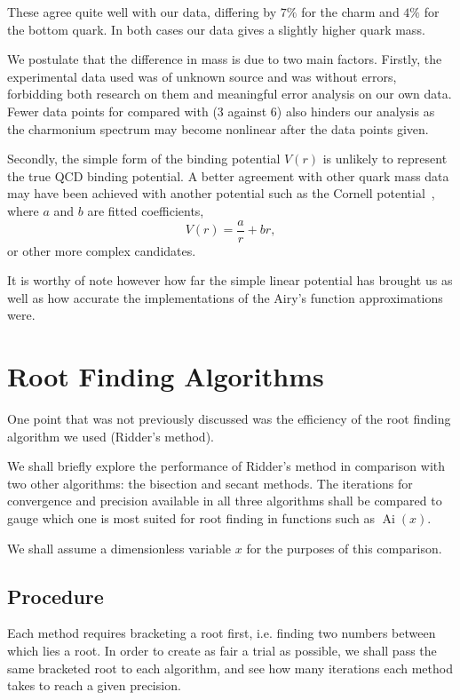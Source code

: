 \documentclass[]{article}
\newcommand{\Ai}[1]{\ensuremath{\operatorname{Ai}({#1})}}
\begin{document}

These agree quite well with our data, differing by $7\%$ for the charm and $4\%$ for the bottom quark. In both cases our data gives a slightly higher quark mass.

We postulate that the difference in mass is due to two main factors. Firstly, the experimental data used was of unknown source and was without errors, forbidding both research on them and meaningful error analysis on our own data. Fewer data points for \ccbar compared with \bbbar (3 against 6) also hinders our analysis as the charmonium spectrum may become nonlinear after the data points given.

Secondly, the simple form of the binding potential $V(r)$ is unlikely to represent the true QCD binding potential. A better agreement with other quark mass data may have been achieved with another potential such as the Cornell potential~\cite{ref:eichten}, where $a$ and $b$ are fitted coefficients,
\[
V(r) = \frac{a}{r} + br,
\]
or other more complex candidates.

It is worthy of note however how far the simple linear potential has brought us as well as how accurate the implementations of the Airy's function approximations were.



\section{Root Finding Algorithms}\label{sec:algorithms}

One point that was not previously discussed was the efficiency of the root finding algorithm we used (Ridder's method).

We shall briefly explore the performance of Ridder's method in comparison with two other algorithms: the bisection and secant methods. The iterations for convergence and precision available in all three algorithms shall be compared to gauge which one is most suited for root finding in functions such as \Ai{x}.

We shall assume a dimensionless variable $x$ for the purposes of this comparison.

\subsection{Procedure}\label{ssec:procedure}

Each method requires bracketing a root first, i.e. finding two numbers between which lies a root. In order to create as fair a trial as possible, we shall pass the same bracketed root to each algorithm, and see how many iterations each method takes to reach a given precision.
\end{document}
